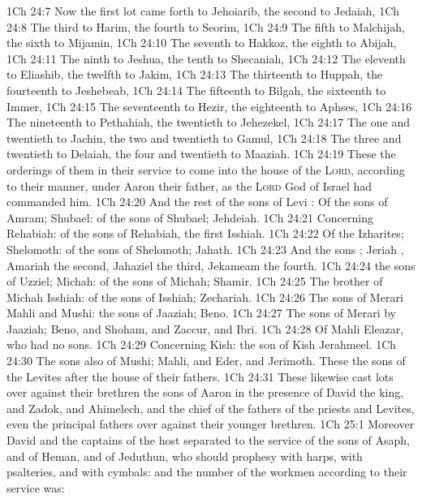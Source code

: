 \vs 1Ch 24:7 Now the first lot came forth to Jehoiarib, the second to Jedaiah,
\vs 1Ch 24:8 The third to Harim, the fourth to Seorim,
\vs 1Ch 24:9 The fifth to Malchijah, the sixth to Mijamin,
\vs 1Ch 24:10 The seventh to Hakkoz, the eighth to Abijah,
\vs 1Ch 24:11 The ninth to Jeshua, the tenth to Shecaniah,
\vs 1Ch 24:12 The eleventh to Eliashib, the twelfth to Jakim,
\vs 1Ch 24:13 The thirteenth to Huppah, the fourteenth to Jeshebeab,
\vs 1Ch 24:14 The fifteenth to Bilgah, the sixteenth to Immer,
\vs 1Ch 24:15 The seventeenth to Hezir, the eighteenth to Aphses,
\vs 1Ch 24:16 The nineteenth to Pethahiah, the twentieth to Jehezekel,
\vs 1Ch 24:17 The one and twentieth to Jachin, the two and twentieth to Gamul,
\vs 1Ch 24:18 The three and twentieth to Delaiah, the four and twentieth to Maaziah.
\vs 1Ch 24:19 These  the orderings of them in their service to come into the house of the \textsc{Lord}, according to their manner, under Aaron their father, as the \textsc{Lord} God of Israel had commanded him.
\vs 1Ch 24:20 And the rest of the sons of Levi : Of the sons of Amram; Shubael: of the sons of Shubael; Jehdeiah.
\vs 1Ch 24:21 Concerning Rehabiah: of the sons of Rehabiah, the first  Isshiah.
\vs 1Ch 24:22 Of the Izharites; Shelomoth: of the sons of Shelomoth; Jahath.
\vs 1Ch 24:23 And the sons ; Jeriah , Amariah the second, Jahaziel the third, Jekameam the fourth.
\vs 1Ch 24:24  the sons of Uzziel; Michah: of the sons of Michah; Shamir.
\vs 1Ch 24:25 The brother of Michah  Isshiah: of the sons of Isshiah; Zechariah.
\vs 1Ch 24:26 The sons of Merari  Mahli and Mushi: the sons of Jaaziah; Beno.
\vs 1Ch 24:27 The sons of Merari by Jaaziah; Beno, and Shoham, and Zaccur, and Ibri.
\vs 1Ch 24:28 Of Mahli  Eleazar, who had no sons.
\vs 1Ch 24:29 Concerning Kish: the son of Kish  Jerahmeel.
\vs 1Ch 24:30 The sons also of Mushi; Mahli, and Eder, and Jerimoth. These  the sons of the Levites after the house of their fathers.
\vs 1Ch 24:31 These likewise cast lots over against their brethren the sons of Aaron in the presence of David the king, and Zadok, and Ahimelech, and the chief of the fathers of the priests and Levites, even the principal fathers over against their younger brethren.
\vs 1Ch 25:1 Moreover David and the captains of the host separated to the service of the sons of Asaph, and of Heman, and of Jeduthun, who should prophesy with harps, with psalteries, and with cymbals: and the number of the workmen according to their service was:
